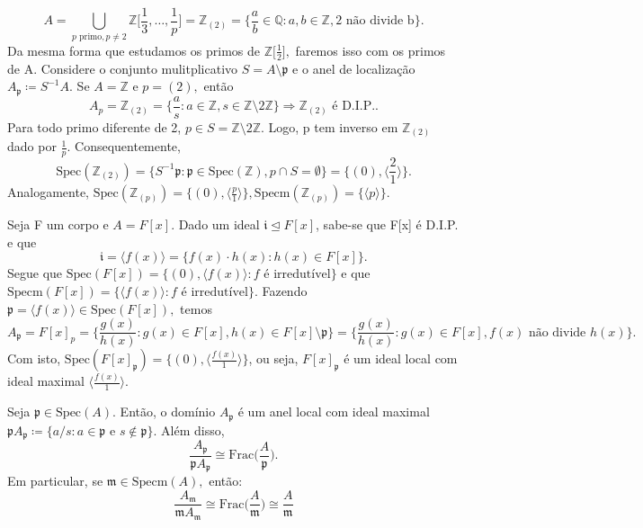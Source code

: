 \documentclass[AlgebraII/algebraII_notes.tex]{subfiles}
\begin{document}
\begin{example}
\begin{itemize}
		      \[
			      A = \bigcup_{p \text{ primo}, p\neq 2}^{}\mathbb{Z}\biggl[\frac{1}{3}, \dotsc , \frac{1}{p}\biggr] = \mathbb{Z}_{(2)} = \biggl\{\frac{a}{b}\in \mathbb{Q}: a, b\in \mathbb{Z}, \text{2 não divide b}\biggr\}.
		      \]
		      Da mesma forma que estudamos os primos de \(\mathbb{Z}\biggl[\frac{1}{2}\biggr],\) faremos isso com os primos de A. Considere o conjunto mulitplicativo
		      \(S = A\setminus{\mathfrak{p}}\) e o anel de localização \(A_{\mathfrak{p}}\coloneqq S^{-1}A.\) Se \(A = \mathbb{Z}\) e \(p = (2),\) então
		      \[
			      A_{p} = \mathbb{Z}_{(2)} = \biggl\{\frac{a}{s}: a\in \mathbb{Z}, s\in \mathbb{Z}\setminus{2 \mathbb{Z}}\biggr\} \Rightarrow \mathbb{Z}_{(2)}\text{ é D.I.P.}.
		      \]
		      Para todo primo diferente de 2, \(p\in S = \mathbb{Z}\setminus{2 \mathbb{Z}}.\) Logo, p tem inverso em \(\mathbb{Z}_{(2)}\) dado por \(\frac{1}{p}\). Consequentemente,
		      \[
			      \mathrm{Spec}(\mathbb{Z}_{(2)}) = \biggl\{S^{-1}\mathfrak{p}: \mathfrak{p}\in \mathrm{Spec}(\mathbb{Z}), p\cap S = \emptyset \biggr\} = \{(0), \langle \frac{2}{1} \rangle\}.
		      \]
		      Analogamente, \(\mathrm{Spec}(\mathbb{Z}_{(p)}) = \{(0), \langle \frac{p}{1} \rangle\}, \mathrm{Specm}(\mathbb{Z}_{(p)}) = \{\langle p \rangle\}\).
	\end{itemize}
\end{example}
\begin{example}
	Seja F um corpo e \(A = F[x]\). Dado um ideal \(\mathfrak{i}\trianglelefteq F[x]\), sabe-se que F[x] é D.I.P. e que
	\[
		\mathfrak{i} = \langle f(x) \rangle = \{f(x)\cdot h(x):h(x)\in F[x]\}.
	\]
	Segue que \(\mathrm{Spec}(F[x]) = \{(0), \langle f(x) \rangle: f \text{ é irredutível}\}\) e que \(\mathrm{Specm}(F[x]) = \{\langle f(x) \rangle: f \text{ é irredutível}\}\).
	Fazendo \(\mathfrak{p} = \langle f(x) \rangle\in \mathrm{Spec}(F[x]),\) temos
	\[
		A_{\mathfrak{p}} = F[x]_{p} = \biggl\{\frac{g(x)}{h(x)}: g(x)\in F[x], h(x)\in F[x]\setminus{\mathfrak{p}}\biggr\} = \biggl\{\frac{g(x)}{h(x)}: g(x)\in F[x], f(x)\text{ não divide }h(x)\biggr\}.
	\]
	Com isto, \(\mathrm{Spec}(F[x]_{\mathfrak{p}}) = \{(0), \langle \frac{f(x)}{1} \rangle\}\), ou seja, \(F[x]_{\mathfrak{p}}\) é um ideal local com ideal maximal \(\langle \frac{f(x)}{1} \rangle.\)
\end{example}
\begin{prop*}
	Seja \(\mathfrak{p}\in \mathrm{Spec}(A)\). Então, o domínio \(A_{\mathfrak{p}}\) é um anel local
	com ideal maximal \(\mathfrak{p}A_{\mathfrak{p}}\coloneqq \{a/s: a\in \mathfrak{p}\text{ e }s\not\in \mathfrak{p}\}.\) Além disso,
	\[
		\frac{A_{\mathfrak{p}}}{\mathfrak{p}A_{\mathfrak{p}}}\cong{\mathrm{Frac}\biggl(\frac{A}{\mathfrak{p}}\biggr).}
	\]
	Em particular, se \(\mathfrak{m}\in \mathrm{Specm}(A),\) então:
	\[
		\frac{A_{\mathfrak{m}}}{\mathfrak{m}A_{\mathfrak{m}}}\cong{\mathrm{Frac}\biggl(\frac{A}{\mathfrak{m}}\biggr)} \cong{\frac{A}{\mathfrak{m}}}
	\]
\end{prop*}
\end{document}

